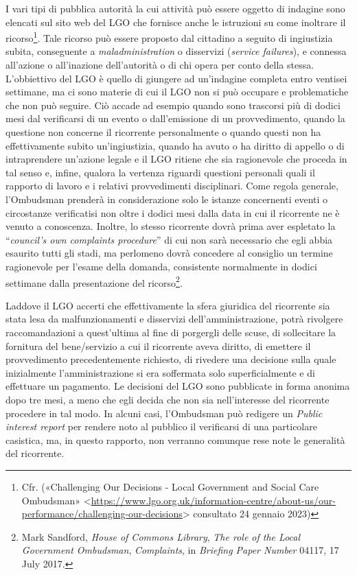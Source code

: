 \documentclass[12pt,it,a4paper,]{report}
\begin{document}
I vari tipi di pubblica autorità la cui attività può essere oggetto di
indagine sono elencati sul sito web del LGO che fornisce anche le
istruzioni su come inoltrare il ricorso\footnote{Cfr. ({«Challenging Our
  Decisions - {Local Government} and {Social Care Ombudsman}»}
  \textless{}\url{https://www.lgo.org.uk/information-centre/about-us/our-performance/challenging-our-decisions}\textgreater{}
  consultato 24 gennaio 2023)}. Tale ricorso può essere proposto dal
cittadino a seguito di ingiustizia subita, conseguente a
\emph{maladministration} o disservizi (\emph{service failures}), e
connessa all'azione o all'inazione dell'autorità o di chi opera per
conto della stessa. L'obbiettivo del LGO è quello di giungere ad
un'indagine completa entro ventisei settimane, ma ci sono materie di cui
il LGO non si può occupare e problematiche che non può seguire. Ciò
accade ad esempio quando sono trascorsi più di dodici mesi dal
verificarsi di un evento o dall'emissione di un provvedimento, quando la
questione non concerne il ricorrente personalmente o quando questi non
ha effettivamente subito un'ingiustizia, quando ha avuto o ha diritto di
appello o di intraprendere un'azione legale e il LGO ritiene che sia
ragionevole che proceda in tal senso e, infine, qualora la vertenza
riguardi questioni personali quali il rapporto di lavoro e i relativi
provvedimenti disciplinari. Come regola generale, l'Ombudsman prenderà
in considerazione solo le istanze concernenti eventi o circostanze
verificatisi non oltre i dodici mesi dalla data in cui il ricorrente ne
è venuto a conoscenza. Inoltre, lo stesso ricorrente dovrà prima aver
espletato la ``\emph{council's own complaints procedure}'' di cui non
sarà necessario che egli abbia esaurito tutti gli stadi, ma perlomeno
dovrà concedere al consiglio un termine ragionevole per l'esame della
domanda, consistente normalmente in dodici settimane dalla presentazione
del ricorso\footnote{Mark Sandford, \emph{House of Commons Library},
  \emph{The role of the Local Government Ombudsman}, \emph{Complaints},
  in \emph{Briefing Paper Number} 04117, 17 July 2017.}.

Laddove il LGO accerti che effettivamente la sfera giuridica del
ricorrente sia stata lesa da malfunzionamenti e disservizi
dell'amministrazione, potrà rivolgere raccomandazioni a quest'ultima al
fine di porgergli delle scuse, di sollecitare la fornitura del
bene/servizio a cui il ricorrente aveva diritto, di emettere il
provvedimento precedentemente richiesto, di rivedere una decisione sulla
quale inizialmente l'amministrazione si era soffermata solo
superficialmente e di effettuare un pagamento. Le decisioni del LGO sono
pubblicate in forma anonima dopo tre mesi, a meno che egli decida che
non sia nell'interesse del ricorrente procedere in tal modo. In alcuni
casi, l'Ombudsman può redigere un \emph{Public interest report} per
rendere noto al pubblico il verificarsi di una particolare casistica,
ma, in questo rapporto, non verranno comunque rese note le generalità
del ricorrente.
\end{document}
